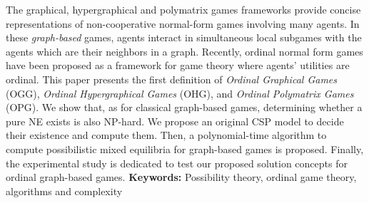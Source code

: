  
 The graphical, hypergraphical and polymatrix games frameworks provide concise representations of non-cooperative normal-form games involving many agents. In these {\em graph-based} games, agents interact in simultaneous local subgames with the agents which are their neighbors in a graph. 
Recently, ordinal normal form games have been proposed as a framework for game theory where agents' utilities are ordinal. 
This paper presents the first definition of \emph{Ordinal Graphical Games} (OGG),  \emph{Ordinal Hypergraphical Games} (OHG), and \emph{Ordinal Polymatrix Games} (OPG). 
We show that, as for classical graph-based games, determining whether a pure NE exists is also NP-hard. We propose an original CSP model to decide their existence and compute them.
Then, a polynomial-time algorithm to compute possibilistic mixed equilibria for graph-based games is proposed. Finally, the experimental study is dedicated to test our proposed solution concepts for ordinal graph-based games.
{\bf Keywords:} Possibility theory, ordinal game theory, algorithms and complexity 

